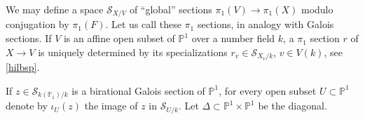 \documentclass[11pt]{amsart}
\theoremstyle{plain}
\theoremstyle{definition}
\newcommand{\on}{\operatorname}
\newcommand{\1}{\mathbb{1}}
\newcommand{\gal}{\on{Gal}}
\newcommand{\mc}{\mathcal}
\newcommand{\s}{\subseteq}
\newcommand{\spec}{\on{Spec}}
\renewcommand{\P}{\mathbb{P}}
\begin{document}
We may define a space $\mc{S}_{X/V}$ of ``global'' sections $\pi_{1}(V)\to\pi_{1}(X)$ modulo conjugation by $\pi_{1}(F)$. Let us call these $\pi_{1}$ sections, in analogy with Galois sections. If $V$ is an affine open subset of $\P^{1}$ over a number field $k$, a $\pi_{1}$ section $r$ of $X\to V$ is uniquely determined by its specializations $r_{v}\in\mc{S}_{X_{v}/k}$, $v\in V(k)$, see \autoref{hilbsp}.

If $z\in\mc{S}_{k(\P_{1})/k}$ is a birational Galois section of $\P^{1}$, for every open subset $U\subset\P^{1}$ denote by $\iota_{U}(z)$ the image of $z$ in $\mc{S}_{U/k}$. Let $\Delta\subset\P^{1}\times\P^{1}$ be the diagonal.



\end{document}
